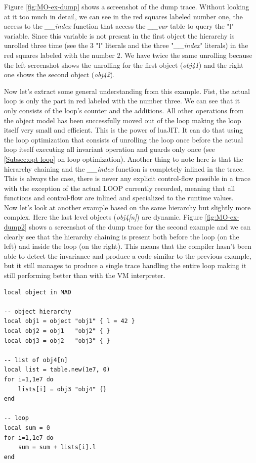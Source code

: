Figure \ref{fig:MO-ex-dump} shows a screenshot of the dump trace. Without looking
at it too much in detail, we can see in the red squares labeled number one, the
access to the \emph{\_\_index} function that access the \emph{\_\_var} table to
query the "l" variable. Since this variable is not present in the first object
the hierarchy is unrolled three time (see the 3 "l" literals and the three
"\emph{\_\_index}" literals) in the red squares labeled with the number 2.
We have twice the same unrolling because the left screenshot shows the
unrolling for the first object (\emph{obj41}) and the right one shows the second
object (\emph{obj42}).

Now let's extract some general understanding from this example. Fist, the actual loop
is only the part in red labeled with the number three. We can see that it only
consists of the loop's counter and the additions. All other operations
from the object model has been successfully moved out of the loop making the loop
itself very small and efficient. This is the power of luaJIT. It can do that
using the loop optimization that consists of unrolling the loop once before the
actual loop itself executing all invariant operation and guards only once
(see \ref{Subsec:opt-loop} on loop optimization). Another thing to note here is
that the hierarchy chaining and the \emph{\_\_index} function is completely
inlined in the trace. This is always the case, there is never any explicit
control-flow possible in a trace with the exception of the actual LOOP currently
recorded, meaning that all functions and control-flow are inlined and specialized
to the runtime values.\\

Now let's look at another example based on the same hierarchy but slightly more
complex. Here the last level objects (\emph{obj4[n]}) are dynamic. Figure
\ref{fig:MO-ex-dump2} shows a screenshot of the dump trace for the second
example and we can clearly see that the hierarchy chaining is present both before
the loop (on the left) and inside the loop (on the right). This means that the
compiler hasn't been able to detect the invariance and produce a code similar to
the previous example, but it still manages to produce a single trace handling the
entire loop making it still performing better than with the VM interpreter.

\begin{lstlisting}[style=LuaStyle]
local object in MAD

-- object hierarchy
local obj1 = object "obj1" { l = 42 }
local obj2 = obj1   "obj2" { }
local obj3 = obj2   "obj3" { }

-- list of obj4[n]
local list = table.new(1e7, 0)
for i=1,1e7 do
	lists[i] = obj3 "obj4" {}
end

-- loop
local sum = 0
for i=1,1e7 do
	sum = sum + lists[i].l
end
\end{lstlisting}

